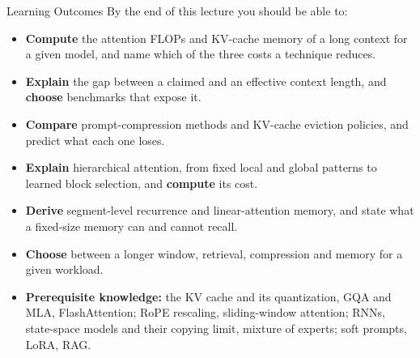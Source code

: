\begin{frame}{Learning Outcomes}
  By the end of this lecture you should be able to:
  \begin{itemize}\small\itemsep0.25em
    \item[\textcolor{red}{$\blacktriangleright$}] \textbf{Compute} the attention FLOPs and KV-cache memory of a long context for a given model, and name which of the three costs a technique reduces.
    \item[\textcolor{red}{$\blacktriangleright$}] \textbf{Explain} the gap between a claimed and an effective context length, and \textbf{choose} benchmarks that expose it.
    \item[\textcolor{red}{$\blacktriangleright$}] \textbf{Compare} prompt-compression methods and KV-cache eviction policies, and predict what each one loses.
    \item[\textcolor{red}{$\blacktriangleright$}] \textbf{Explain} hierarchical attention, from fixed local and global patterns to learned block selection, and \textbf{compute} its cost.
    \item[\textcolor{red}{$\blacktriangleright$}] \textbf{Derive} segment-level recurrence and linear-attention memory, and state what a fixed-size memory can and cannot recall.
    \item[\textcolor{red}{$\blacktriangleright$}] \textbf{Choose} between a longer window, retrieval, compression and memory for a given workload.
  \end{itemize}
  \begin{itemize}\scriptsize
    \item[\textcolor{red}{$\blacktriangleright$}] \textbf{Prerequisite knowledge:} the KV cache and its quantization, GQA and MLA, FlashAttention; RoPE rescaling, sliding-window attention; RNNs, state-space models and their copying limit, mixture of experts; soft prompts, LoRA, RAG.
  \end{itemize}
\end{frame}
